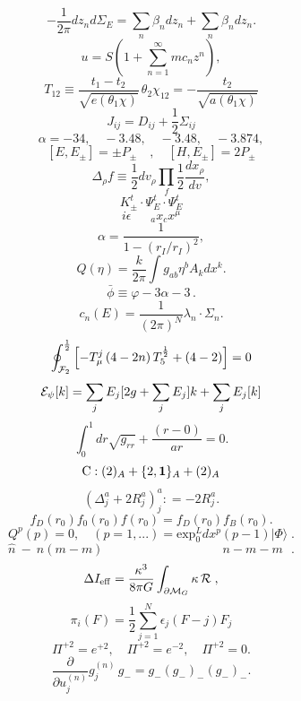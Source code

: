 \documentclass{article}
\begin{document}
$$- \frac { 1 } { 2 \pi } d z _ { n } d \Sigma _ { E } = \sum _ { n } \beta _ { n } d z _ { n } + \sum _ { n } \beta _ { n } d z _ { n } .$$
$$u = S \left ( 1 + \sum _ { n = 1 } ^ { \infty } m c _ { n } z ^ { n } \right ) ,$$
$$T _ { 1 2 } \equiv \frac { t _ { 1 } - t _ { 2 } } { \sqrt { e ( \theta _ { 1 } \chi ) } } \, \theta _ { 2 } \chi _ { 1 2 } = - \frac { t _ { 2 } } { \sqrt { a ( \theta _ { 1 } \chi ) } }$$
$$J _ { i j } = D _ { i j } + \frac { 1 } { 2 } \Sigma _ { i j }$$
$$\alpha = - 3 4 , \quad - 3 . 4 8 , \quad - 3 . 4 8 , \quad - 3 . 8 7 4 ,$$
$$[ E , E _ { \pm } ] = \pm P _ { \pm } \quad , \quad [ H , E _ { \pm } ] = 2 P _ { \pm }$$
$$\Delta _ { \rho } f \equiv \frac { 1 } { 2 } d v _ { \rho } \prod _ { f } \frac { 1 } { 2 } \frac { d x _ { \rho } } { d v } ,$$
$$K _ { \pm } ^ { t } \cdot \Psi _ { E } ^ { t } \cdot \Psi _ { E } ^ { t }$$
$$i \epsilon _ { \; \; \; \; \; \; \; \; a } x _ { c } x ^ { \mu }$$
$$\alpha = \frac { 1 } { 1 - ( r _ { I } / r _ { I } ) ^ { 2 } } ,$$
$$Q ( \eta ) = \frac { k } { 2 \pi } \int g _ { a b } \eta ^ { b } A _ { k } d x ^ { k } .$$
$$\bar { \phi } \equiv \varphi - 3 \alpha - 3 \, .$$
$$c _ { n } ( E ) = \frac { 1 } { ( 2 \pi ) ^ { N } } \lambda _ { n } \cdot \Sigma _ { n } .$$
$$\oint _ { { \cal F } _ { 2 } } ^ { \frac { 1 } { 2 } } \left [ - T _ { \mu } ^ { j } \left ( 4 - 2 n \right ) T _ { 5 } ^ { \frac { 1 } { 2 } } + ( 4 - 2 ) \right ] = 0$$
$${ \cal E } _ { \psi } [ k ] = \sum _ { j } E _ { j } [ 2 g + \sum _ { j } E _ { j } ] k + \sum _ { j } E _ { j } [ k ]$$
$$\int _ { 0 } ^ { 1 } d r \sqrt { g _ { r r } } + { \frac { ( r - 0 ) } { a r } } = 0 .$$
$$\mathrm { C } : ( 2 ) _ { A } + \{ 2 , { \bf 1 } \} _ { A } + ( 2 ) _ { A }$$
$$( \Delta _ { j } ^ { a } + 2 R _ { j } ^ { a } ) _ { j } ^ { a } : = - 2 R _ { j } ^ { a } .$$
$$f _ { D } ( r _ { 0 } ) f _ { 0 } ( r _ { 0 } ) f ( r _ { 0 } ) = f _ { D } ( r _ { 0 } ) f _ { B } ( r _ { 0 } ) .$$
$$Q ^ { p } ( p ) = 0 , \quad ( p = 1 , . . . ) = \mathrm { e x p } _ { 0 } ^ { L } d x ^ { p } ( p - 1 ) | \Phi \rangle \; .$$
$$\hat { n } ~ - ~ n ( m - m ) ~ ~ ~ ~ ~ ~ ~ ~ ~ ~ ~ ~ ~ ~ ~ ~ ~ ~ ~ ~ ~ ~ ~ ~ ~ ~ ~ ~ ~ ~ ~ ~ ~ ~ ~ ~ ~ ~ ~ ~ ~ ~ ~ n - m - m ~ ~ ~ .$$
$$\Delta I _ { \mathrm { e f f } } = \frac { \kappa ^ { 3 } } { 8 \pi G } \int _ { \partial \mathcal { M } _ { G } } \kappa \, { \cal R } \; ,$$
$$\pi _ { i } ( F ) = \frac { 1 } { 2 } \sum _ { j = 1 } ^ { N } \epsilon _ { j } ( F - j ) F _ { j }$$
$$\Pi ^ { + 2 } = e ^ { + 2 } , \quad \Pi ^ { + 2 } = e ^ { - 2 } , \quad \Pi ^ { + 2 } = 0 .$$
$$\frac { \partial } { \partial u _ { j } ^ { ( n ) } } g _ { j } ^ { ( n ) } \, g _ { - } = g _ { - } \left ( g _ { - } \right ) _ { - } \left ( g _ { - } \right ) _ { - } .$$
\end{document}
